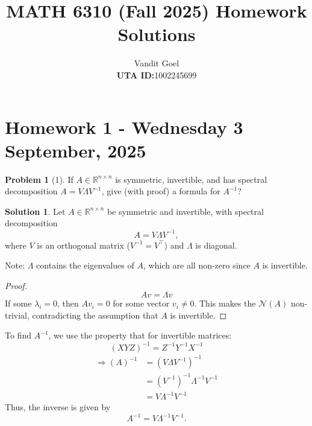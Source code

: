 \documentclass{amsart}[11pt]
\title{MATH 6310 (Fall 2025) Homework Solutions}
\author{Vandit Goel\\\textbf{UTA ID:}1002245699\\}
\theoremstyle{definition}
\newtheorem*{problem}{Problem}
\newtheorem*{solution}{Solution}
\newcommand{\R}{\mathbb{R}}
\begin{document}
\maketitle

\section{Homework 1 - Wednesday  3 September, 2025}

\begin{problem}[1]
If $A\in\R^{n\times n}$ is symmetric, invertible, and has spectral decomposition $A=V\Lambda V^{-1}$, give (with proof) a formula for $A^{-1}$?

\begin{solution}
Let $A \in \mathbb{R}^{n \times n}$ be symmetric and invertible, with spectral decomposition
\[
A = V \Lambda V^{-1},
\]
where $V$ is an orthogonal matrix ($V^{-1} = V^\top$) and $\Lambda$ is diagonal.

Note: $\Lambda$ contains the eigenvalues of $A$, which are all non-zero since $A$ is invertible.
\begin{proof}
    \[Av=\Lambda v\]
    If some $\lambda_{i}=0$, then $Av_{i}=0$ for some vector $v_{i} \neq 0$. This makes the $\mathcal{N}(A)$ non-trivial, contradicting the assumption that $A$ is invertible.
\end{proof}

\vspace{\baselineskip}
\noindent To find $A^{-1}$, we use the property that for invertible matrices:
\[
(XYZ)^{-1} = Z^{-1} Y^{-1} X^{-1}
\]
\begin{align*}
	\Rightarrow(A)^{-1} &= (V \Lambda V^{-1})^{-1} \\
	&= (V^{-1})^{-1}\Lambda^{-1} V^{-1} \\
	&= V\Lambda^{-1} V^{-1}
\end{align*}
Thus, the inverse is given by
\[
A^{-1} = V \Lambda^{-1} V^{-1}.
\]
\end{solution}
\end{problem}
\end{document}
